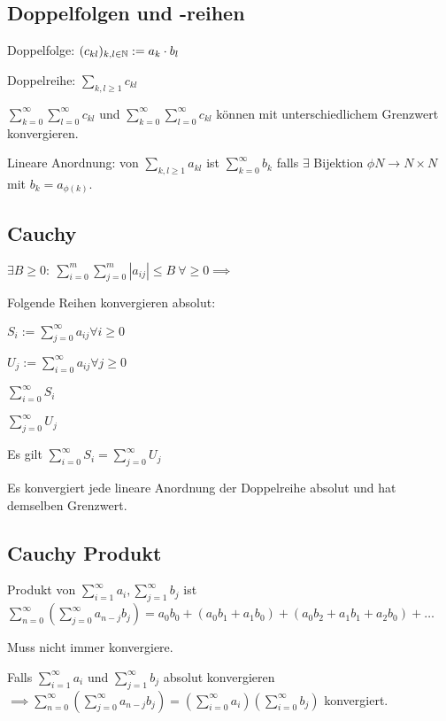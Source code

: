 \subsection{Doppelfolgen und -reihen}
\begin{compactdesc}
    \item[Doppelfolge:] $(c_{kl})_{k,l \in \mathbb{N}} := a_k \cdot b_l$
    \item[Doppelreihe:] $\sum_{k,l\ge1} c_{kl}$
        \begin{compactitem}
            \item $\sum_{k=0}^{\infty} \sum_{l=0}^{\infty}c_{kl}$ und $\sum_{k=0}^{\infty} \sum_{l=0}^{\infty}c_{kl}$ können mit unterschiedlichem Grenzwert konvergieren.
        \end{compactitem}
    \item[Lineare Anordnung:] von $\sum_{k,l \ge 1} a_{kl}$ ist $\sum_{k=0}^{\infty} b_k$ falls $\exists$ Bijektion $\phi N \to N \times N$ mit $b_k = a_{\phi(k)}$.
\end{compactdesc}

\subsection{Cauchy}
$\exists B \ge 0: \ \sum_{i=0}^{m} \sum_{j=0}^{m} \left| a_{ij} \right| \le B \ \forall \ge 0 \implies$
\begin{compactitem}
    \item Folgende Reihen konvergieren absolut: 
        \begin{compactitem}
            \item $S_i := \sum_{j=0}^{\infty} a_{ij} \forall i \ge 0$
            \item $U_j := \sum_{i=0}^{\infty} a_{ij} \forall j \ge 0$
            \item $\sum_{i=0}^{\infty} S_i$
            \item $\sum_{j=0}^{\infty} U_j$
        \end{compactitem}
    \item Es gilt $\sum_{i=0}^{\infty} S_i = \sum_{j=0}^{\infty} U_j$
    \item Es konvergiert jede lineare Anordnung der Doppelreihe absolut und hat demselben Grenzwert.
\end{compactitem}

\subsection{Cauchy Produkt}
Produkt von $\sum_{i=1}^{\infty} a_i, \sum_{j=1}^{\infty} b_j$ ist $\sum_{n=0}^{\infty} \left( \sum_{j=0}^{\infty} a_{n-j}b_j \right) = a_0b_0 + (a_0b_1 + a_1b_0) + (a_0b_2 + a_1b_1 + a_2b_0) + \dots$
\begin{compactitem}
    \item Muss nicht immer konvergiere.
    \item Falls $\sum_{i=1}^{\infty} a_i$ und $\sum_{j=1}^{\infty} b_j$ absolut konvergieren $\implies \sum_{n=0}^{\infty} \left( \sum_{j=0}^{\infty} a_{n-j}b_j \right) = \left( \sum_{i=0}^{\infty} a_i \right) \left( \sum_{i=0}^{\infty} b_j \right) $ konvergiert.
\end{compactitem}

